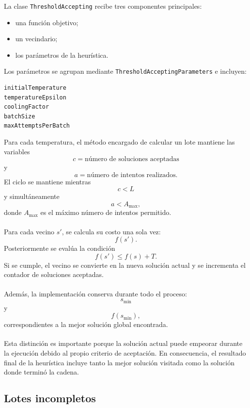 \documentclass[12pt]{article}
\begin{document}
La clase \texttt{ThresholdAccepting} recibe tres componentes principales:
\begin{itemize}
    \item una función objetivo;
    \item un vecindario;
    \item los parámetros de la heurística.
\end{itemize}
Los parámetros se agrupan mediante
\texttt{ThresholdAcceptingParameters} e incluyen:
\begin{verbatim}
initialTemperature
temperatureEpsilon
coolingFactor
batchSize
maxAttemptsPerBatch
\end{verbatim}
Para cada temperatura, el método encargado de calcular un lote mantiene las
variables
\[
    c=
    \text{número de soluciones aceptadas}
\]
y
\[
    a=
    \text{número de intentos realizados}.
\]
El ciclo se mantiene mientras
\[
    c<L
\]
y simultáneamente
\[
    a<A_{\max},
\]
donde \(A_{\max}\) es el máximo número de intentos permitido.
\\\\
Para cada vecino \(s'\), se calcula su costo una sola vez:
\[
    f(s').
\]
Posteriormente se evalúa la condición
\[
    f(s')
    \leq
    f(s)+T.
\]
Si se cumple, el vecino se convierte en la nueva solución actual y se
incrementa el contador de soluciones aceptadas.
\\\\
Además, la implementación conserva durante todo el proceso:
\[
    s_{\min}
\]
y
\[
    f(s_{\min}),
\]
correspondientes a la mejor solución global encontrada.
\\\\
Esta distinción es importante porque la solución actual puede empeorar
durante la ejecución debido al propio criterio de aceptación. En
consecuencia, el resultado final de la heurística incluye tanto la mejor
solución visitada como la solución donde terminó la cadena.

\subsection{Lotes incompletos}
\end{document}
